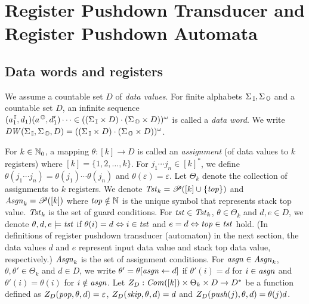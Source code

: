 \section{Register Pushdown Transducer and Register Pushdown Automata}
\subsection{Data words and registers}
We assume a countable set $D$ of \emph{data values}.
For finite alphabets $\Sigma_{\, \mathbb{I}},\Sigma_{\, \mathbb{O}}$ and a countable set $D$,
an infinite sequence $(a^{\, \mathbb{I}}_1,d_1)(a^{\, \mathbb{O}},d'_1)\cdots \in ((\Sigma_{\, \mathbb{I}}\times D)\cdot(\Sigma_{\, \mathbb{O}}\times D))^\omega$ is called a \emph{data word}.
We write $\mathit{DW}(\Sigma_{\, \mathbb{I}},\Sigma_{\, \mathbb{O}},D)=((\Sigma_{\, \mathbb{I}}\times D)\cdot(\Sigma_{\, \mathbb{O}}\times D))^\omega$.

For $k\in\mathbb{N}_0$, a mapping $\theta: [k] \to D$ is called an \emph{assignment}
(of data values to $k$ registers) where $[k]=\{1,2,\ldots,k\}$.
For $j_1\cdots j_n\in [k]^*$, we define $\theta(j_1\cdots j_n)=\theta(j_1)\cdots\theta(j_n)$ and $\theta(\varepsilon) = \varepsilon$.
Let $\Theta_k$ denote the collection of assignments to $k$ registers.
We denote $\mathit{Tst}_k = \mathscr{P}([k]\cup\{\mathit{top}\})$ and $\mathit{Asgn}_k = \mathscr{P}([k])$
where $\mathit{top}\notin\mathbb{N}$ is the unique symbol that represents stack top value.
$\mathit{Tst}_k$ is the set of guard conditions.
For $\mathit{tst}\in\mathit{Tst}_k$, $\theta\in\Theta_k$ and $d,e\in D$,
we denote $\theta,d,e\models\mathit{tst}$ if $\theta(i) = d \Leftrightarrow i\in\mathit{tst}$
and $e = d \Leftrightarrow \mathit{top}\in\mathit{tst}$ hold.
(In definitions of register pushdown transducer (automaton) in the next section,
the data values $d$ and $e$ represent input data value and stack top data value, respectively.)
$\mathit{Asgn}_k$ is the set of assignment conditions.
For $\mathit{asgn}\in\mathit{Asgn}_k$, $\theta,\theta'\in\Theta_k$ and $d\in D$,
we write $\theta' = \theta[\mathit{asgn}\leftarrow d]$ if
$\theta'(i) = d$ for $i\in\mathit{asgn}$ and $\theta'(i)=\theta(i)$ for $i\notin\mathit{asgn}$.
Let $Z_D: \mathit{Com}([k])\times \Theta_k\times D \to D^*$ be a function defined as
$Z_D(\mathit{pop},\theta,d)=\varepsilon$, $Z_D(\mathit{skip},\theta,d)=d$ and $Z_D(\mathit{push}(j),\theta,d)=\theta(j)d$.

